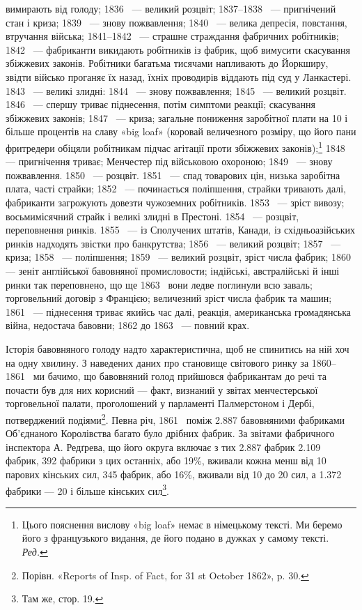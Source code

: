 \parcont{}  %
вимирають від голоду; 1836~ — великий розцвіт; 1837--1838~ —
пригнічений стан і криза; 1839~ — знову пожвавлення; 1840~ —
велика депресія, повстання, втручання війська; 1841--1842~ —
страшне страждання фабричних робітників; 1842~ — фабриканти
викидають робітників із фабрик, щоб вимусити скасування збіжжевих
законів. Робітники багатьма тисячами напливають до
Йоркширу, звідти військо проганяє їх назад, їхніх проводирів
віддають під суд у Ланкастері. 1843~ — великі злидні: 1844~ —
знову пожвавлення; 1845~ — великий розцвіт. 1846~ — спершу
триває піднесення, потім симптоми реакції; скасування збіжжевих
законів; 1847~ — криза; загальне пониження заробітної плати
на 10 і більше процентів на славу «big loaf» (коровай величезного
розміру, що його пани фритредери обіцяли робітникам підчас
агітації проти збіжжевих законів);\footnote*{
Цього пояснення вислову «big loaf» немає в німецькому тексті.
Ми беремо його з французького видання, де його подано в дужках у самому
тексті. \emph{Ред.}
} 1848~ — пригнічення триває; Менчестер під військовою охороною; 1849~ —
знову пожвавлення. 1850~ — розцвіт. 1851~ — спад товарових цін, низька
заробітна плата, часті страйки; 1852~ — починається поліпшення,
страйки тривають далі, фабриканти загрожують довезти чужоземних
робітників. 1853~ — зріст вивозу; восьмимісячний страйк
і великі злидні в Престоні. 1854~ — розцвіт, переповнення ринків.
1855~ — із Сполучених штатів, Канади, із східньоазійських
ринків надходять звістки про банкрутства; 1856~ — великий
розцвіт; 1857~ — криза; 1858~ — поліпшення; 1859~ — великий
розцвіт, зріст числа фабрик; 1860~ — зеніт англійської
бавовняної промисловости; індійські, австралійські й інші ринки
так переповнено, що ще 1863~ вони ледве поглинули всю заваль;
торговельний договір з Францією; величезний зріст числа фабрик
та машин; 1861~ — піднесення триває якийсь час далі, реакція,
американська громадянська війна, недостача бавовни; 1862 до
1863~ — повний крах.

Історія бавовняного голоду надто характеристична, щоб не
спинитись на ній хоч на одну хвилину. З наведених даних про
становище світового ринку за 1860--1861~ ми бачимо, що
бавовняний голод прийшовся фабрикантам до речі та почасти був
для них корисний — факт, визнаний у звітах менчестерської
торговельної палати, проголошений у парламенті Палмерстоном
і Дербі, потверджений подіями\footnote{
Порівн. «Reports of Insp. of Fact, for 31 st October 1862», p. 30.
}. Певна річ, 1861~
поміж \num{2.887} бавовняними фабриками Об’єднаного Королівства
багато було дрібних фабрик. За звітами фабричного інспектора
А. Редґрева, що його округа включає з тих \num{2.887} фабрик \num{2.109} фабрик,
392 фабрики з цих останніх, або 19\%, вживали кожна
менш від 10 парових кінських сил, 345 фабрик, або 16\%, вживали
від 10 до 20 сил, а \num{1.372} фабрики — 20 і більше кінських сил\footnote{
Там же, стор. 19.
}.
\parbreak{}  %
